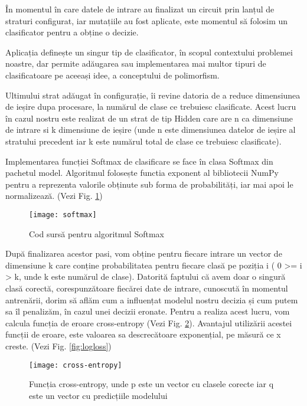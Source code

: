 	În momentul în care datele de intrare au finalizat un circuit prin lanțul de straturi configurat, iar mutațiile au fost aplicate, este momentul să folosim un clasificator pentru a obține o decizie. 
	
	Aplicația definește un singur tip de clasificator, în scopul contextului problemei noastre, dar permite adăugarea sau implementarea mai multor tipuri de clasificatoare pe aceeași idee, a conceptului de polimorfism. 
	
	Ultimului strat adăugat în configurație, îi revine datoria de a reduce dimensiunea de ieșire dupa procesare, la numărul de clase ce trebuiesc clasificate. Acest lucru în cazul nostru este realizat de un strat de tip Hidden care are n ca dimensiune de intrare si k dimensiune de ieșire (unde n este dimensiunea datelor de ieșire al stratului precedent iar k este numărul total de clase ce trebuiesc clasificate).
	 
	Implementarea funcției Softmax de clasificare se face în clasa Softmax din pachetul model. Algoritmul folosește functia exponent al bibliotecii NumPy pentru a reprezenta valorile obținute sub forma de probabilități, iar mai apoi le normalizează. (Vezi Fig. \ref{fig:softmax})
	
	\vfill
	
	\begin{figure}[H]
		\texttt{[image: softmax]}
		\caption{\label{fig:softmax} Cod sursă pentru algoritmul Softmax}
	\end{figure}

	\newpage
	
	După finalizarea acestor pasi, vom obține pentru fiecare intrare un vector de dimensiune k care conține probabilitatea pentru fiecare clasă pe poziția i ( 0 >= i > k, unde k este numărul de clase). Datorită faptului că avem doar o singură clasă corectă, corespunzătoare fiecărei date de intrare, cunoscută în momentul antrenării, dorim să aflăm cum a influențat modelul nostru decizia și cum putem sa îl penalizăm, în cazul unei decizii eronate. Pentru a realiza acest lucru, vom calcula funcția de eroare cross-entropy (Vezi Fig. \ref{fig:cross-entropy}). Avantajul utilizării acestei funcții de eroare, este valoarea sa descrecătoare exponențial, pe măsură ce x creste. (Vezi Fig. \ref{fig:logloss})
	
	\begin{figure}[H]
		\texttt{[image: cross-entropy]}
		\caption{\label{fig:cross-entropy} Funcția cross-entropy, unde p este un vector cu clasele corecte iar q este un vector cu predicțiile modelului}
	\end{figure}	
	
